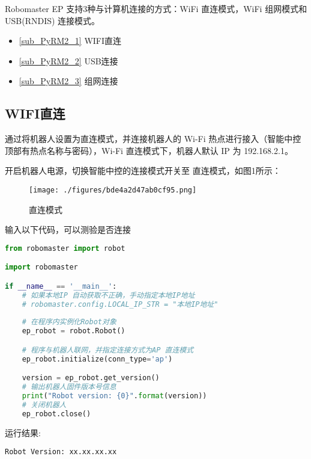

Robomaster EP 支持3种与计算机连接的方式：WiFi 直连模式，WiFi 组网模式和 USB(RNDIS) 连接模式。

\begin{itemize}
\item \autoref{sub_PyRM2_1} WIFI直连
\item \autoref{sub_PyRM2_2} USB连接
\item \autoref{sub_PyRM2_3} 组网连接
\end{itemize}

\subsection{WIFI直连}\label{sub_PyRM2_1}

通过将机器人设置为直连模式，并连接机器人的 Wi-Fi 热点进行接入（智能中控顶部有热点名称与密码），Wi-Fi 直连模式下，机器人默认 IP 为 192.168.2.1。

开启机器人电源，切换智能中控的连接模式开关至 直连模式，如图1所示：

\begin{figure}[ht]
\centering
\texttt{[image: ./figures/bde4a2d47ab0cf95.png]}
\caption{直连模式} \label{fig_PyRM2_1}
\end{figure}

输入以下代码，可以测验是否连接

\begin{lstlisting}[language=python]
from robomaster import robot

import robomaster

if __name__ == '__main__':
    # 如果本地IP 自动获取不正确，手动指定本地IP地址
    # robomaster.config.LOCAL_IP_STR = "本地IP地址"
    
    # 在程序内实例化Robot对象
    ep_robot = robot.Robot()

    # 程序与机器人联网，并指定连接方式为AP 直连模式
    ep_robot.initialize(conn_type='ap')

    version = ep_robot.get_version()
    # 输出机器人固件版本号信息
    print("Robot version: {0}".format(version))
    # 关闭机器人
    ep_robot.close()
\end{lstlisting}

运行结果:
\begin{lstlisting}[language=pythonC]
Robot Version: xx.xx.xx.xx
\end{lstlisting}

